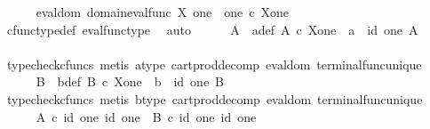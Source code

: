 \begin{isabellebody}
\isanewline
\ \ \ \ \isamarkupfalse%
\ eval{\isacharunderscore}{\kern0pt}dom{\isacharcolon}{\kern0pt}\ {\isachardoublequoteopen}domain{\isacharparenleft}{\kern0pt}eval{\isacharunderscore}{\kern0pt}func\ X\ one{\isacharparenright}{\kern0pt}\ {\isacharequal}{\kern0pt}\ one\ {\isasymtimes}\isactrlsub c\ {\isacharparenleft}{\kern0pt}X\isactrlbsup one\isactrlesup {\isacharparenright}{\kern0pt}{\isachardoublequoteclose}\isanewline
\ \ \ \ \ \ \isamarkupfalse%
\ cfunc{\isacharunderscore}{\kern0pt}type{\isacharunderscore}{\kern0pt}def\ eval{\isacharunderscore}{\kern0pt}func{\isacharunderscore}{\kern0pt}type\ \isamarkupfalse%
\ auto\isanewline
\isanewline
\ \ \ \ \isamarkupfalse%
\ A\ \ a{\isacharunderscore}{\kern0pt}def{\isacharcolon}{\kern0pt}\ {\isachardoublequoteopen}A\ {\isasymin}\isactrlsub c\ X\isactrlbsup one\isactrlesup \ {\isasymand}\ a\ {\isacharequal}{\kern0pt}\ {\isasymlangle}id\ one{\isacharcomma}{\kern0pt}\ A{\isasymrangle}{\isachardoublequoteclose}\isanewline
\ \ \ \ \ \ \isamarkupfalse%
\ {\isacharparenleft}{\kern0pt}typecheck{\isacharunderscore}{\kern0pt}cfuncs{\isacharcomma}{\kern0pt}\ metis\ a{\isacharunderscore}{\kern0pt}type\ cart{\isacharunderscore}{\kern0pt}prod{\isacharunderscore}{\kern0pt}decomp\ eval{\isacharunderscore}{\kern0pt}dom\ terminal{\isacharunderscore}{\kern0pt}func{\isacharunderscore}{\kern0pt}unique{\isacharparenright}{\kern0pt}\isanewline
\isanewline
\ \ \ \ \isamarkupfalse%
\ B\ \ b{\isacharunderscore}{\kern0pt}def{\isacharcolon}{\kern0pt}\ {\isachardoublequoteopen}B\ {\isasymin}\isactrlsub c\ X\isactrlbsup one\isactrlesup \ {\isasymand}\ b\ {\isacharequal}{\kern0pt}\ {\isasymlangle}id\ one{\isacharcomma}{\kern0pt}\ B{\isasymrangle}{\isachardoublequoteclose}\isanewline
\ \ \ \ \ \ \isamarkupfalse%
\ {\isacharparenleft}{\kern0pt}typecheck{\isacharunderscore}{\kern0pt}cfuncs{\isacharcomma}{\kern0pt}\ metis\ b{\isacharunderscore}{\kern0pt}type\ cart{\isacharunderscore}{\kern0pt}prod{\isacharunderscore}{\kern0pt}decomp\ eval{\isacharunderscore}{\kern0pt}dom\ terminal{\isacharunderscore}{\kern0pt}func{\isacharunderscore}{\kern0pt}unique{\isacharparenright}{\kern0pt}\isanewline
\isanewline
\ \ \ \ \isamarkupfalse%
\ {\isachardoublequoteopen}A\isactrlsup {\isasymflat}\ {\isasymcirc}\isactrlsub c\ {\isasymlangle}id\ one{\isacharcomma}{\kern0pt}\ id\ one{\isasymrangle}\ {\isacharequal}{\kern0pt}\ B\isactrlsup {\isasymflat}\ {\isasymcirc}\isactrlsub c\ {\isasymlangle}id\ one{\isacharcomma}{\kern0pt}\ id\ one{\isasymrangle}{\isachardoublequoteclose}\isanewline

\end{isabellebody}
